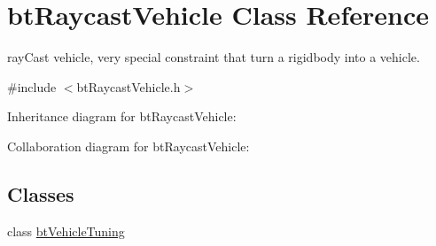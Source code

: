\hypertarget{classbt_raycast_vehicle}{\section{bt\+Raycast\+Vehicle Class Reference}
\label{classbt_raycast_vehicle}
}


ray\+Cast vehicle, very special constraint that turn a rigidbody into a vehicle.  




{\ttfamily \#include $<$bt\+Raycast\+Vehicle.\+h$>$}



Inheritance diagram for bt\+Raycast\+Vehicle\+:


Collaboration diagram for bt\+Raycast\+Vehicle\+:
\subsection*{Classes}
\begin{DoxyCompactItemize}
\item 
class \hyperlink{classbt_raycast_vehicle_1_1bt_vehicle_tuning}{bt\+Vehicle\+Tuning}
\end{DoxyCompactItemize}

